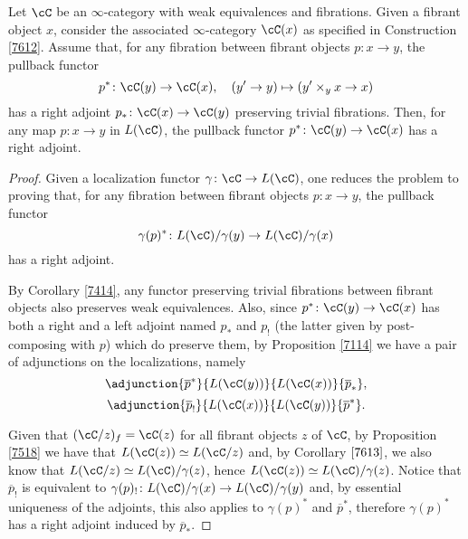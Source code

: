 \begin{thm}\label{7616}

  Let $\cC$ be an $\infty$-category with weak equivalences and fibrations. Given
  a fibrant object $x$, consider the associated $\infty$-category $\cC(x)$ as
  specified in Construction \ref{7612}.
  Assume that, for any fibration between fibrant objects
  $p\colon x\rightarrow y$, the pullback functor
  \[p^*\colon\cC(y)\rightarrow\cC(x),\quad (y'\rightarrow y)\mapsto(y'\times_y
  x\rightarrow x)\] has a right adjoint $p_*\colon\cC(x)\rightarrow\cC(y)$
  preserving trivial fibrations. Then, for any map $p\colon x\rightarrow y$ in
  $L(\cC)$, the pullback functor $p^*\colon\cC(y)\rightarrow\cC(x)$ has a right
  adjoint.
\end{thm}
\begin{proof}

  Given a localization functor $\gamma\colon\cC\rightarrow L(\cC)$, one reduces
  the problem to proving that, for any fibration between fibrant objects
  $p\colon x\rightarrow y$, the pullback functor
  \[\gamma(p)^*\colon L(\cC)/\gamma(y)\rightarrow L(\cC)/\gamma(x)\]
  has a right adjoint.

  By Corollary \ref{7414}, any functor preserving
  trivial fibrations between fibrant objects also preserves weak equivalences.
  Also, since $p^*\colon\cC(y)\rightarrow\cC(x)$ has both a right and a left
  adjoint named $p_*$ and $p_!$ (the latter given by post-composing with $p$)
  which do preserve them, by Proposition \ref{7114} we have a pair of
  adjunctions on the localizations, namely
  \[\adjunction{\overline{p}^*}{L(\cC(y))}{L(\cC(x))}{\overline{p}_*},\]
  \[\adjunction{\overline{p}_!}{L(\cC(x))}{L(\cC(y))}{\overline{p}^*}.\]

  Given that $(\cC/z)_f=\cC(z)$ for all fibrant objects $z$ of $\cC$, by
  Proposition \ref{7518} we have that $L(\cC(z))\simeq L(\cC/z)$ and, by
  Corollary $\ref{7613}$, we also know that $L(\cC/z)\simeq L(\cC)/\gamma(z)$, hence
  $L(\cC(z))\simeq L(\cC)/\gamma(z)$. Notice that $\overline{p}_!$ is equivalent
  to $\gamma(p)_!\colon L(\cC)/\gamma(x)\rightarrow L(\cC)/\gamma(y)$ and, by
  essential uniqueness of the adjoints, this also applies to $\gamma(p)^*$ and
  $\overline{p}^*$, therefore $\gamma(p)^*$ has a right adjoint induced by
  $\overline{p}_*$.
\end{proof}
